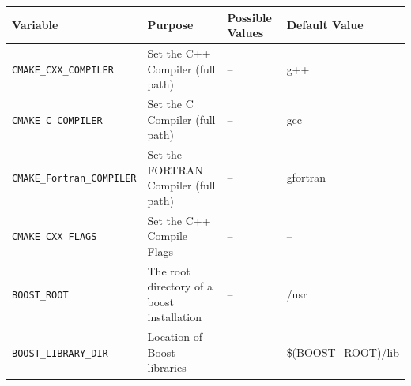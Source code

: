\documentclass[12pt]{article}
\begin{document}
    \begin{table}[h!]
      \begin{center}
        \begin{tabular}{|l|l|l|l|}
	  \hline
	  Variable        & 
	  Purpose         & 
	  Possible Values & 
	  Default Value  \\
	  \hline
	  \hline

	  \texttt{CMAKE\_CXX\_COMPILER}      & 
	  Set the C++ Compiler (full path)   & 
	  --                                 & 
	  g++                                \\

	  \hline

	  \texttt{CMAKE\_C\_COMPILER}      & 
	  Set the C Compiler (full path)   & 
	  --                               & 
	  gcc                              \\

	  \hline

	  \texttt{CMAKE\_Fortran\_COMPILER}      & 
	  Set the FORTRAN Compiler (full path)   & 
	  --                                     & 
	  gfortran                               \\

	  \hline

	  \texttt{CMAKE\_CXX\_FLAGS} & 
	  Set the C++ Compile Flags  &
	  --                         &
	  --                         \\

	  \hline

	  \texttt{BOOST\_ROOT}                       &
	  The root directory of a boost installation &
	  --                                         &
	  /usr                                       \\

	  \hline

	  \texttt{BOOST\_LIBRARY\_DIR}  &
	  Location of Boost libraries &
	  --                          &
	  \$(BOOST\_ROOT)/lib         \\


	\end{tabular}
      \end{center}
    \end{table}
\end{document}
